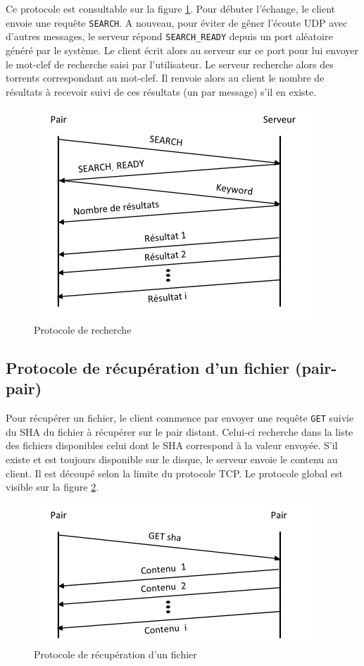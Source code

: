 Ce protocole est consultable sur la figure \ref{search}. Pour débuter l'échange, le client envoie une requête \texttt{SEARCH}. A nouveau, pour éviter de gêner l'écoute 
UDP avec d'autres messages, le serveur répond \texttt{SEARCH\_READY} depuis un port aléatoire généré par le système. Le client écrit alors au serveur sur ce port 
pour lui envoyer le mot-clef de recherche saisi par l'utilisateur. Le serveur recherche alors des torrents correspondant au mot-clef. Il renvoie alors au client 
le nombre de résultats à recevoir suivi de ces résultats (un par message) s'il en existe.

\begin{figure}
	\begin{center}
		\includegraphics[scale=1]{Search.png}
	\end{center}
	\caption{Protocole de recherche}
	\label{search}
\end{figure}

\subsection{Protocole de récupération d'un fichier (pair-pair)}

Pour récupérer un fichier, le client commence par envoyer une requête \texttt{GET} suivie du SHA du fichier à récupérer sur le pair distant. Celui-ci recherche dans la liste 
des fichiers disponibles celui dont le SHA correspond à la valeur envoyée. S'il existe et est toujours disponible sur le disque, le serveur envoie le contenu au client. Il est 
découpé selon la limite du protocole TCP. Le protocole global est visible sur la figure \ref{get}.

\begin{figure}
	\begin{center}
		\includegraphics[scale=1]{Get.png}
	\end{center}
	\caption{Protocole de récupération d'un fichier}
	\label{get}
\end{figure}